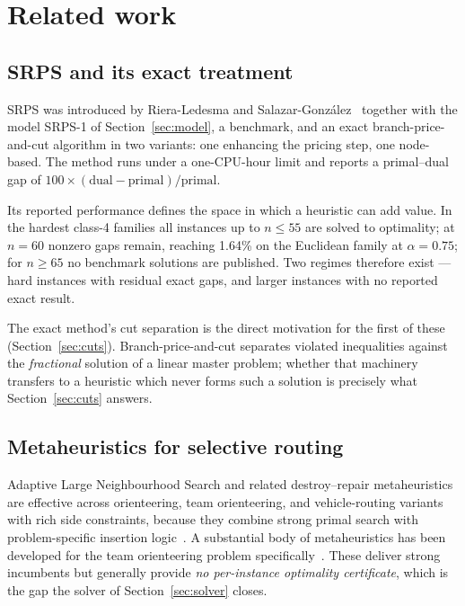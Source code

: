 \documentclass[11pt,a4paper]{article}
\begin{document}
\section{Related work}\label{sec:related}

\subsection{SRPS and its exact treatment}

SRPS was introduced by Riera-Ledesma and
Salazar-Gonz\'alez~\cite{RieraLedesma2021SRPS} together with the model SRPS-1 of
Section~\ref{sec:model}, a benchmark, and an exact branch-price-and-cut algorithm
in two variants: one enhancing the pricing step, one node-based. The method runs
under a one-CPU-hour limit and reports a primal--dual gap of
$100\times(\text{dual}-\text{primal})/\text{primal}$.

Its reported performance defines the space in which a heuristic can add value. In
the hardest class-4 families all instances up to $n\le 55$ are solved to
optimality; at $n=60$ nonzero gaps remain, reaching 1.64\% on the Euclidean family
at $\alpha=0.75$; for $n\ge 65$ no benchmark solutions are published. Two regimes
therefore exist --- hard instances with residual exact gaps, and larger instances
with no reported exact result.

The exact method's cut separation is the direct motivation for the first of
these (Section~\ref{sec:cuts}).
Branch-price-and-cut separates violated inequalities against the \emph{fractional}
solution of a linear master problem; whether that machinery transfers to a
heuristic which never forms such a solution is precisely what
Section~\ref{sec:cuts} answers.

\subsection{Metaheuristics for selective routing}

Adaptive Large Neighbourhood Search and related destroy--repair metaheuristics are
effective across orienteering, team orienteering, and vehicle-routing variants
with rich side constraints, because they combine strong primal search with
problem-specific insertion
logic~\cite{RopkePisinger2006ALNS,Vansteenwegen2011Orienteering}. A substantial
body of metaheuristics has been developed for the team orienteering problem
specifically~\cite{Archetti2007MetaheuristicsTOP}. These deliver strong incumbents
but generally provide \emph{no per-instance optimality certificate}, which is the
gap the solver of Section~\ref{sec:solver} closes.
\end{document}
